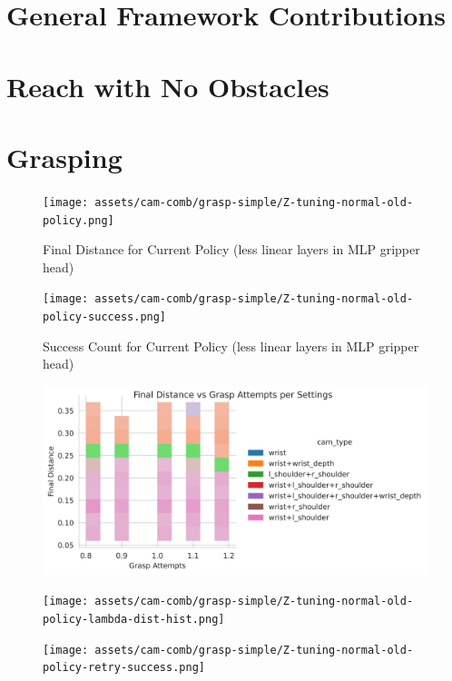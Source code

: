 \section{General Framework Contributions}


\section{Reach with No Obstacles}

\section{Grasping}
  \begin{figure}[H] 
    \centering
    \texttt{[image: assets/cam-comb/grasp-simple/Z-tuning-normal-old-policy.png]}
    \caption{Final Distance for Current Policy (less linear layers in MLP gripper head)}
  \end{figure}

  \begin{figure}[H] 
    \centering
    \texttt{[image: assets/cam-comb/grasp-simple/Z-tuning-normal-old-policy-success.png]}
    \caption{Success Count for Current Policy (less linear layers in MLP gripper head)}
  \end{figure}

  \begin{figure}[H] 
    \centering
    \includegraphics[scale=0.6]{assets/cam-comb/grasp-simple/Z-tuning-normal-old-policy-lambda-dist-hist-hue-cams.png}
    \caption{}
  \end{figure}


  \begin{figure}[H] 
    \centering
    \texttt{[image: assets/cam-comb/grasp-simple/Z-tuning-normal-old-policy-lambda-dist-hist.png]}
    \caption{}
  \end{figure}

  \begin{figure}[H] 
    \centering
    \texttt{[image: assets/cam-comb/grasp-simple/Z-tuning-normal-old-policy-retry-success.png]}
    \caption{}
  \end{figure}

